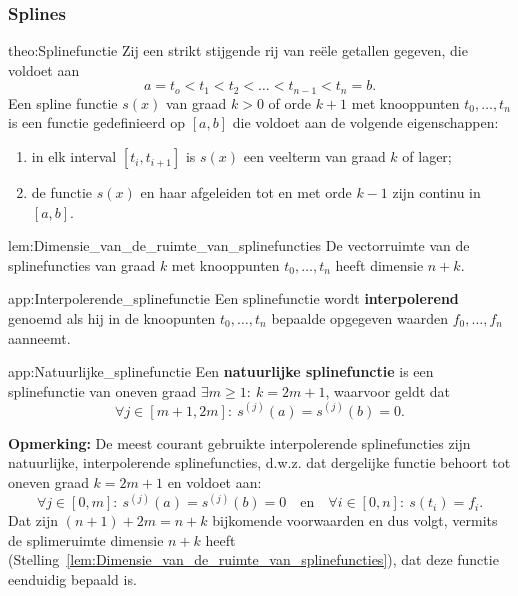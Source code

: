 \subsubsection{Splines}

\vspace{0.5cm}

\begin{theo}[Splinefunctie]{theo:Splinefunctie}
    Zij een strikt stijgende rij van reële getallen gegeven, die voldoet aan
    \begin{equation*}
        a = t_o < t_1 < t_2 < \ldots < t_{n-1} < t_n = b.
    \end{equation*}
    Een spline functie $s(x)$ van graad $k > 0$ of orde $k+1$ met knooppunten $t_0,\ldots,t_n$ is een functie gedefinieerd op $[a,b]$ die voldoet aan de volgende eigenschappen:
    \begin{enumerate}
        \item in elk interval $[t_i,t_{i+1}]$ is $s(x)$ een veelterm van graad $k$ of lager;
        \item de functie $s(x)$ en haar afgeleiden tot en met orde $k-1$ zijn continu in $[a,b]$.
    \end{enumerate}
\end{theo}

\begin{lem}{lem:Dimensie_van_de_ruimte_van_splinefuncties}
    De vectorruimte van de splinefuncties van graad $k$ met knooppunten $t_0,\ldots,t_n$ heeft dimensie $n+k$.    
\end{lem}

\begin{app}{app:Interpolerende_splinefunctie}
    Een splinefunctie wordt \textbf{interpolerend} genoemd als hij in de knoopunten $t_0,\ldots,t_n$ bepaalde opgegeven waarden $f_0,\ldots,f_n$ aanneemt.
\end{app}

\begin{app}{app:Natuurlijke_splinefunctie}
    Een \textbf{natuurlijke splinefunctie} is een splinefunctie van oneven graad $\exists m \geq 1:\ k = 2m+1$, waarvoor geldt dat 
    \begin{equation*}
        \forall j \in [m+1,2m]:\ s^{(j)}(a) = s^{(j)}(b) = 0.
    \end{equation*}
    \vspace{0.1cm}

    \textbf{Opmerking:} De meest courant gebruikte interpolerende splinefuncties zijn natuurlijke, interpolerende splinefuncties, d\@.w\@.z\@. dat dergelijke functie behoort tot oneven graad $k = 2m+1$ en voldoet aan:
    \begin{equation*}
        \forall j \in [0,m]:\ s^{(j)}(a) = s^{(j)}(b) = 0 \quad \text{en} \quad \forall i \in [0,n]:\ s(t_i) = f_i.
    \end{equation*}
    Dat zijn $(n+1) + 2m = n + k$ bijkomende voorwaarden en dus volgt, vermits de splimeruimte dimensie $n+k$ heeft (Stelling~\ref{lem:Dimensie_van_de_ruimte_van_splinefuncties}), dat deze functie eenduidig bepaald is.
\end{app}

